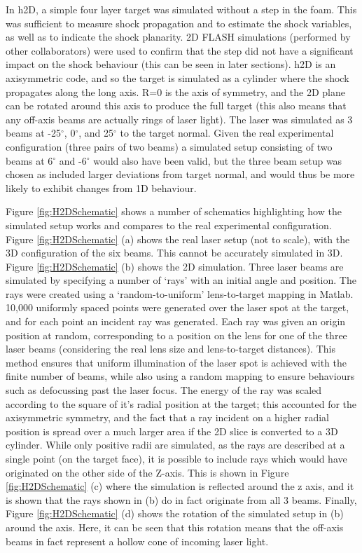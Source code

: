 In h2D, a simple four layer target was simulated without a step in the foam. This was sufficient to measure shock propagation and to estimate the shock variables, as well as to indicate the shock planarity. 2D FLASH simulations (performed by other collaborators) were used to confirm that the step did not have a significant impact on the shock behaviour (this can be seen in later sections). h2D is an axisymmetric code, and so the target is simulated as a cylinder where the shock propagates along the long axis. R=0 is the axis of symmetry, and the 2D plane can be rotated around this axis to produce the full target (this also means that any off-axis beams are actually rings of laser light). The laser was simulated as 3 beams at -25$^{\circ}$, 0$^{\circ}$, and 25$^{\circ}$ to the target normal. Given the real experimental configuration (three pairs of two beams) a simulated setup consisting of two beams at 6$^{\circ}$ and -6$^{\circ}$ would also have been valid, but the three beam setup was chosen as included larger deviations from target normal, and would thus be more likely to exhibit changes from 1D behaviour. 

Figure \ref{fig:H2DSchematic} shows a number of schematics highlighting how the simulated setup works and compares to the real experimental configuration. Figure \ref{fig:H2DSchematic} (a) shows the real laser setup (not to scale), with the 3D configuration of the six beams. This cannot be accurately simulated in 3D. Figure \ref{fig:H2DSchematic} (b) shows the 2D simulation. Three laser beams are simulated by specifying a number of `rays' with an initial angle and position. The rays were created using a `random-to-uniform' lens-to-target mapping in Matlab. 10,000 uniformly spaced points were generated over the laser spot at the target, and for each point an incident ray was generated. Each ray was given an origin position at random, corresponding to a position on the lens for one of the three laser beams (considering the real lens size and lens-to-target distances). This method ensures that uniform illumination of the laser spot is achieved with the finite number of beams, while also using a random mapping to ensure behaviours such as defocussing past the laser focus. The energy of the ray was scaled according to the square of it's radial position at the target; this accounted for the axisymmetric symmetry, and the fact that a ray incident on a higher radial position is spread over a much larger area if the 2D slice is converted to a 3D cylinder. While only positive radii are simulated, as the rays are described at a single point (on the target face), it is possible to include rays which would have originated on the other side of the Z-axis. This is shown in Figure \ref{fig:H2DSchematic} (c) where the simulation is reflected around the z axis, and it is shown that the rays shown in (b) do in fact originate from all 3 beams. Finally, Figure \ref{fig:H2DSchematic} (d) shows the rotation of the simulated setup in (b) around the axis. Here, it can be seen that this rotation means that the off-axis beams in fact represent a hollow cone of incoming laser light.

